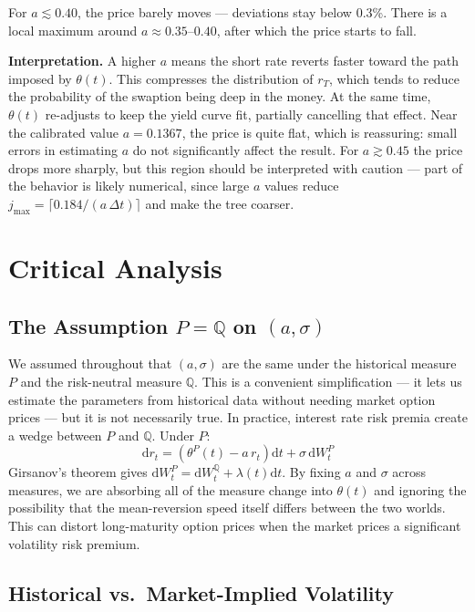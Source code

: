 \documentclass[12pt, a4paper]{article}
\newcommand{\Q}{\mathbb{Q}}
\newcommand{\diff}{\mathrm{d}}
\begin{document}
For $a \lesssim 0.40$, the price barely moves — deviations stay below 0.3\%. There is a local maximum around $a \approx 0.35$--$0.40$, after which the price starts to fall.

\textbf{Interpretation.} A higher $a$ means the short rate reverts faster toward the path imposed by $\theta(t)$. This compresses the distribution of $r_T$, which tends to reduce the probability of the swaption being deep in the money. At the same time, $\theta(t)$ re-adjusts to keep the yield curve fit, partially cancelling that effect. Near the calibrated value $a = 0.1367$, the price is quite flat, which is reassuring: small errors in estimating $a$ do not significantly affect the result. For $a \gtrsim 0.45$ the price drops more sharply, but this region should be interpreted with caution — part of the behavior is likely numerical, since large $a$ values reduce $j_{\max} = \lceil 0.184/(a\,\Delta t)\rceil$ and make the tree coarser.

\section{Critical Analysis}

\subsection{The Assumption $P = \Q$ on $(a, \sigma)$}

We assumed throughout that $(a, \sigma)$ are the same under the historical measure $P$ and the risk-neutral measure $\Q$. This is a convenient simplification — it lets us estimate the parameters from historical data without needing market option prices — but it is not necessarily true. In practice, interest rate risk premia create a wedge between $P$ and $\Q$. Under $P$:
\begin{equation}
\diff r_t = (\theta^P(t) - a\,r_t)\diff t + \sigma\,\diff W_t^P
\end{equation}
Girsanov's theorem gives $\diff W_t^P = \diff W_t^{\Q} + \lambda(t)\diff t$. By fixing $a$ and $\sigma$ across measures, we are absorbing all of the measure change into $\theta(t)$ and ignoring the possibility that the mean-reversion speed itself differs between the two worlds. This can distort long-maturity option prices when the market prices a significant volatility risk premium.

\subsection{Historical vs.\ Market-Implied Volatility}
\end{document}
